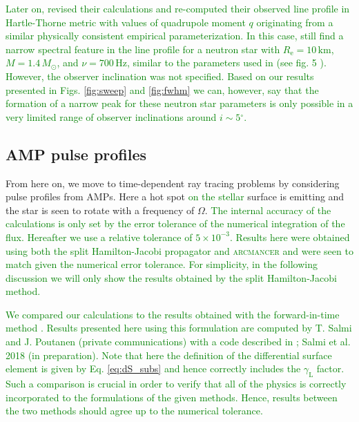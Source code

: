 \documentclass{aa}
\newcommand{\refe}[1]{\textcolor{green}{{#1}}}
\newcommand{\refedel}[1]{}
\newcommand{\Msun}{\ensuremath{M_{\odot}}}
\newcommand{\lgamma}{\gamma_{\text{L}}}
\renewcommand{\deg}{\ensuremath{^{\circ}}}
\begin{document}
\refe{
Later on, \citet{BBP13} revised their calculations and re-computed their observed line profile in Hartle-Thorne metric with values of quadrupole moment $q$ originating from a similar physically consistent empirical parameterization.
In this case, \citet{BBP13} still find a narrow spectral feature in the line profile for a neutron star with $R_{\mathrm{e}} = 10\,\mathrm{km}$, $M=1.4\,\Msun$, and $\nu = 700\,\mathrm{Hz}$, similar to the parameters used in \citet{BPO13} (see fig. 5 \citealt{BBP13}).
However, the observer inclination was not specified.
Based on our results presented in Figs. \ref{fig:sweep} and \ref{fig:fwhm} we can, however, say that the formation of a narrow peak for these neutron star parameters is only possible in a very limited range of observer inclinations around $i \sim 5\deg$.
}




\subsection{AMP pulse profiles}\label{sect:AMPs}

From here on, we move to time-dependent ray tracing problems by considering pulse profiles from AMPs.
Here a hot spot\refedel{ on top of} \refe{on the stellar} surface is emitting and the star is seen to rotate with a frequency of $\Omega$.
\refe{The internal accuracy of the calculations is only set by the error tolerance of the numerical integration of the flux.
Hereafter we use a relative tolerance of $5 \times 10^{-3}$.
Results here were obtained using both the split Hamilton-Jacobi propagator and \textsc{arcmancer} and were seen to match given the numerical error tolerance.
For simplicity, in the following discussion we will only show the results obtained by the split Hamilton-Jacobi method.
}

\refe{
We compared our calculations to the results obtained with the forward-in-time method \citep[see e.g.,][]{PB06, MLC07}.
Results presented here using this formulation are computed by T. Salmi and J. Poutanen (private communications) with a code described in \citet{PB06}; Salmi et al. 2018 (in preparation).
Note that here the definition of the differential surface element is given by Eq. \eqref{eq:dS_subs} and hence correctly includes the $\lgamma$ factor.
Such a comparison is crucial in order to verify that all of the physics is correctly incorporated to the formulations of the given methods.
Hence, results between the two methods should agree up to the numerical tolerance.
}
\end{document}
